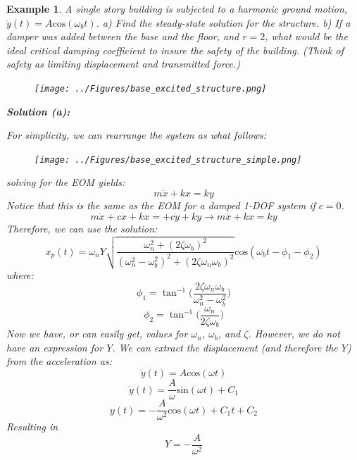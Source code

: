 \documentclass[12pt,letter]{article}
\newtheorem{ex}{Example}
\numberwithin{ex}{section} %
\newenvironment{example}{\begin{mdframed}[middlelinewidth=0.5mm]\begin{ex}\normalfont}{\end{ex}\end{mdframed}}
\numberwithin{re}{section} %
\begin{document}
				\begin{example}
		
					A single story building is subjected to a harmonic ground motion, $\ddot{y}(t) = A \text{cos}(\omega_b t)$. a) Find the steady-state solution for the structure.  b) If a damper was added between the base and the floor, and $r=2$, what would be the ideal critical damping coefficient to insure the safety of the building. (Think of safety as limiting displacement and transmitted force.) 
					\begin{figure}[H]
						\centering
						\texttt{[image: ../Figures/base\_excited\_structure.png]}
					\end{figure}				
								
					\noindent\textbf{Solution (a):}
						
					For simplicity, we can rearrange the system as what follows:
					\begin{figure}[H]
						\centering
						\texttt{[image: ../Figures/base\_excited\_structure\_simple.png]}
					\end{figure}			
		
					solving for the EOM yields:
					\begin{equation}
						m\ddot{x} + kx = ky
					\end{equation} 				
					Notice that this is the same as the EOM for a damped 1-DOF system if $c=0$.	
					\begin{equation}
					m\ddot{x} + c\dot{x} + kx = + c\dot{y} + ky \rightarrow m\ddot{x} + kx = ky
					\end{equation}
					Therefore, we can use the solution:
					\begin{equation}
						x_p(t) = 	\omega_n Y   \sqrt{\frac{\omega_n^2 + (2 \zeta \omega_b)^2 }{(\omega_n^2 - \omega_b^2)^2 +  (2\zeta \omega_n \omega_b)^2} }  \text{cos}(\omega_bt - \phi_1 - \phi_2)
					\end{equation}
					where:
					\begin{equation}
						\phi_1 = \tan^{-1} \bigg(\frac{2\zeta \omega_n \omega_b}{\omega_n^2 - \omega_b^2}\bigg)
					\end{equation}	
					\begin{equation}
						\phi_2 = \tan^{-1} \bigg(\frac{\omega_n}{2\zeta \omega_b}\bigg)
					\end{equation}
					Now we have, or can easily get, values for $\omega_n$, $\omega_b$, and $\zeta$. However, we do not have an expression for $Y$. We can extract the displacement (and therefore the $Y$) from the acceleration as:
					\begin{equation}
						\ddot{y}(t) = A \text{cos}(\omega t)
					\end{equation} 				
					\begin{equation}
						\dot{y}(t) = \frac{A}{\omega} \text{sin}(\omega t) + C_1
					\end{equation} 					
					\begin{equation}
						y(t) = - \frac{A}{\omega^2} \text{cos}(\omega t) + C_1t + C_2
					\end{equation} 					
					Resulting in 
					\begin{equation}
						Y = -\frac{A}{\omega^2}
					\end{equation} 			
					

\end{example}
\end{document}
